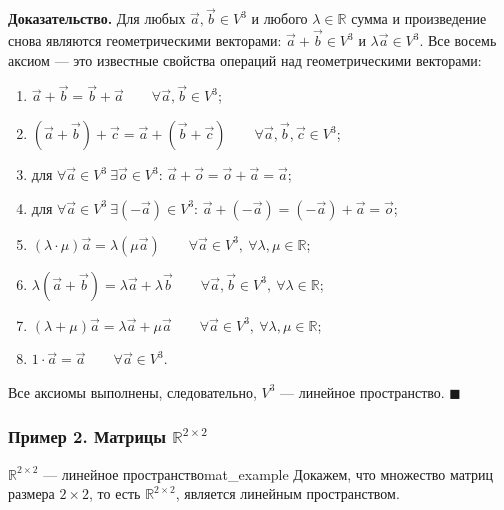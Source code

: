 \documentclass[12pt,a4paper]{article}
\newenvironment{myproof}{\noindent\textbf{Доказательство.}}{\hfill$\blacksquare$}
\begin{document}
\begin{myproof}
Для любых $\vec{a}, \vec{b} \in V^3$ и любого $\lambda \in \mathbb{R}$
сумма и произведение снова являются геометрическими векторами:
$\vec{a} + \vec{b} \in V^3$ и $\lambda\vec{a} \in V^3$. Все восемь
аксиом — это известные свойства операций над геометрическими векторами:
\begin{enumerate}
\item $\vec{a} + \vec{b} = \vec{b} + \vec{a}
\qquad \forall \vec{a}, \vec{b} \in V^3$;
\item $(\vec{a} + \vec{b}) + \vec{c} = \vec{a} + (\vec{b} + \vec{c})
\qquad \forall \vec{a}, \vec{b}, \vec{c} \in V^3$;
\item для $\forall \vec{a} \in V^3 \ \exists \vec{o} \in V^3$:
$\vec{a} + \vec{o} = \vec{o} + \vec{a} = \vec{a}$;
\item для $\forall \vec{a} \in V^3 \ \exists (-\vec{a}) \in V^3$:
$\vec{a} + (-\vec{a}) = (-\vec{a}) + \vec{a} = \vec{o}$;
\item $(\lambda \cdot \mu)\vec{a} = \lambda(\mu\vec{a})
\qquad \forall \vec{a} \in V^3,\ \forall \lambda, \mu \in \mathbb{R}$;
\item $\lambda(\vec{a} + \vec{b}) = \lambda\vec{a} + \lambda\vec{b}
\qquad \forall \vec{a}, \vec{b} \in V^3,\ \forall \lambda \in \mathbb{R}$;
\item $(\lambda + \mu)\vec{a} = \lambda\vec{a} + \mu\vec{a}
\qquad \forall \vec{a} \in V^3,\ \forall \lambda, \mu \in \mathbb{R}$;
\item $1 \cdot \vec{a} = \vec{a} \qquad \forall \vec{a} \in V^3$.
\end{enumerate}
Все аксиомы выполнены, следовательно, $V^3$ — линейное пространство.
\end{myproof}

\subsubsection*{Пример 2. Матрицы $\mathbb{R}^{2\times 2}$}

\begin{definition}{$\mathbb{R}^{2\times 2}$ — линейное
пространство}{mat_example}
Докажем, что множество матриц размера $2 \times 2$, то есть
$\mathbb{R}^{2\times 2}$, является линейным пространством.
\end{definition}
\end{document}
